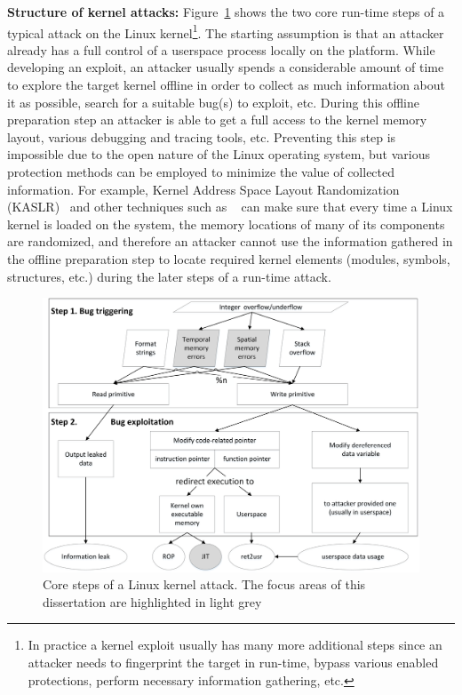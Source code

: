 \textbf{Structure of kernel attacks:}   Figure~\ref{fig:exploit-steps} shows the two core run-time steps of a typical attack on the Linux kernel\footnote{In practice a kernel exploit usually has many more additional steps since an attacker needs to fingerprint the target in run-time, bypass various enabled protections, perform necessary information gathering, etc.}. The starting assumption is that an attacker already has a full control of a userspace process locally on the platform. While developing an exploit, an attacker usually spends a considerable amount of time to explore the target kernel offline in order to collect as much information about it as possible, search for a suitable bug(s) to exploit, etc. During this offline preparation step an attacker is able to get a full access to the kernel memory layout, various debugging and tracing tools, etc. Preventing this step is impossible due to the open nature of the Linux operating system, but various protection methods can be employed to minimize the value of collected information. For example, Kernel Address Space Layout Randomization (KASLR)~\cite{cook2013} and other techniques such as ~\cite{randstruct2017} can make sure that every time a Linux kernel is loaded on the system, the memory locations of many of its components are randomized, and therefore an attacker cannot use the information gathered in the offline preparation step to locate required kernel elements (modules, symbols, structures, etc.) during the later steps of a run-time attack. 

\begin{figure}[t]
	\centering
		\includegraphics[width=1\textwidth]{figures/kernel_exploit_steps.png}
	\caption{Core steps of a Linux kernel attack. The focus areas of this dissertation are highlighted in light grey}
	\label{fig:exploit-steps}
\end{figure}    

